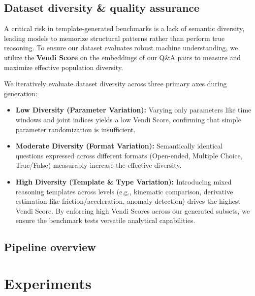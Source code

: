 \documentclass{article}
\begin{document}

\subsection{Dataset diversity \& quality assurance}


A critical risk in template-generated benchmarks is a lack of semantic diversity, leading models to memorize structural patterns rather than perform true reasoning. To ensure our dataset evaluates robust machine understanding, we utilize the \textbf{Vendi Score} on the embeddings of our Q\&A pairs to measure and maximize effective population diversity.

We iteratively evaluate dataset diversity across three primary axes during generation:

\begin{itemize}
    \item \textbf{Low Diversity (Parameter Variation):} Varying only parameters like time windows and joint indices yields a low Vendi Score, confirming that simple parameter randomization is insufficient.
    \item \textbf{Moderate Diversity (Format Variation):} Semantically identical questions expressed across different formats (Open-ended, Multiple Choice, True/False) measurably increase the effective diversity.
    \item \textbf{High Diversity (Template \& Type Variation):} Introducing mixed reasoning templates across levels (e.g., kinematic comparison, derivative estimation like friction/acceleration, anomaly detection) drives the highest Vendi Score. By enforcing high Vendi Scores across our generated subsets, we ensure the benchmark tests versatile analytical capabilities.
\end{itemize}

\subsection{Pipeline overview}


\section{Experiments}
\end{document}
